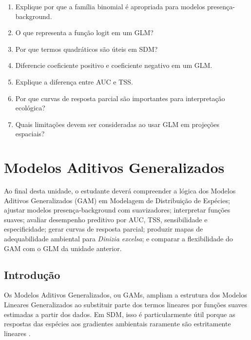 \documentclass{ueap-sdm}
\begin{document}
\begin{enumerate}
	\item Explique por que a família binomial é apropriada para modelos presença-background.
	\item O que representa a função logit em um GLM?
	\item Por que termos quadráticos são úteis em SDM?
	\item Diferencie coeficiente positivo e coeficiente negativo em um GLM.
	\item Explique a diferença entre AUC e TSS.
	\item Por que curvas de resposta parcial são importantes para interpretação ecológica?
	\item Quais limitações devem ser consideradas ao usar GLM em projeções espaciais?
\end{enumerate}


\chapter[GAM]{Modelos Aditivos Generalizados}

\begin{objetivos}
	Ao final desta unidade, o estudante deverá compreender a lógica dos Modelos Aditivos Generalizados (GAM) em Modelagem de Distribuição de Espécies; ajustar modelos presença-background com suavizadores; interpretar funções suaves; avaliar desempenho preditivo por AUC, TSS, sensibilidade e especificidade; gerar curvas de resposta parcial; produzir mapas de adequabilidade ambiental para \textit{Dinizia excelsa}; e comparar a flexibilidade do GAM com o GLM da unidade anterior.
\end{objetivos}

\section{Introdução}

Os Modelos Aditivos Generalizados, ou GAMs, ampliam a estrutura dos Modelos Lineares Generalizados ao substituir parte dos termos lineares por funções suaves estimadas a partir dos dados. Em SDM, isso é particularmente útil porque as respostas das espécies aos gradientes ambientais raramente são estritamente lineares \parencite{guisan2002,guisan2017habitat,wood2017generalized}.
\end{document}
